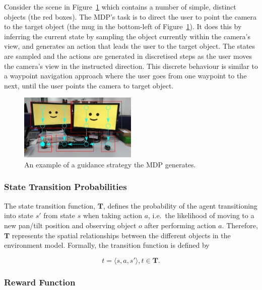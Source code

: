 \documentclass[a4paper, twoside]{article}
\begin{document}
Consider the scene in Figure~\ref{fig:route-example} which contains a number of simple, distinct objects (the red boxes). The MDP's task is to direct the user to point the camera to the target object (the mug in the bottom-left of Figure~\ref{fig:route-example}). It does this by inferring the current state by sampling the object currently within the camera's view, and generates an action that leads the user to the target object. The states are sampled and the actions are generated in discretised steps as the user moves the camera's view in the instructed direction. This discrete behaviour is similar to a waypoint navigation approach where the user goes from one waypoint to the next, until the user points the camera to target object. 

\begin{figure}
  \centering
  \includegraphics[width=0.5\textwidth]{figures/office_desk_example.png}
  \caption{An example of a guidance strategy the MDP generates. }\label{fig:route-example}
\end{figure}

\subsubsection{State Transition Probabilities}

\noindent The state transition function, $\mathbf{T}$, defines the probability of the agent transitioning into state $s'$ from state $s$ when taking action $a$, i.e.\ the likelihood of moving to a new pan/tilt position and observing object $o$ after performing action $a$. Therefore, $\mathbf{T}$ represents the spatial relationships between the different objects in the environment model. Formally, the transition function is defined by

\begin{equation}
  t=\langle{}s, a, s'\rangle, t\in{}\mathbf{T}.
\end{equation}

\subsubsection{Reward Function}
\end{document}
